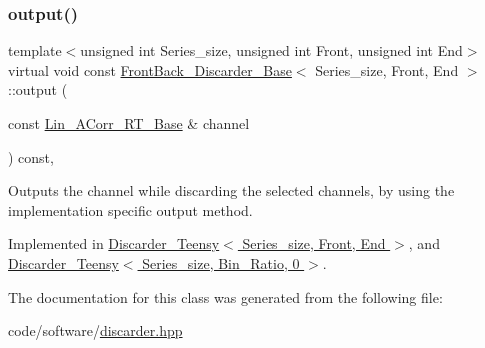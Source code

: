 \subsubsection{\texorpdfstring{output()}{output()}}
{\footnotesize\ttfamily template$<$unsigned int Series\+\_\+size, unsigned int Front, unsigned int End$>$ \\
virtual void const \hyperlink{classFrontBack__Discarder__Base}{Front\+Back\+\_\+\+Discarder\+\_\+\+Base}$<$ Series\+\_\+size, Front, End $>$\+::output (\begin{DoxyParamCaption}\item[{const \hyperlink{classLin__ACorr__RT__Base}{Lin\+\_\+\+A\+Corr\+\_\+\+R\+T\+\_\+\+Base} \&}]{channel }\end{DoxyParamCaption}) const\hspace{0.3cm}{\ttfamily [inline]}, {}}



Outputs the channel while discarding the selected channels, by using the implementation specific output method. 



Implemented in \hyperlink{classDiscarder__Teensy_a968465e540ae1372c26c9c6d0e5c928b}{Discarder\+\_\+\+Teensy$<$ Series\+\_\+size, Front, End $>$}, and \hyperlink{classDiscarder__Teensy_a968465e540ae1372c26c9c6d0e5c928b}{Discarder\+\_\+\+Teensy$<$ Series\+\_\+size, Bin\+\_\+\+Ratio, 0 $>$}.



The documentation for this class was generated from the following file\+:\begin{DoxyCompactItemize}
\item 
code/software/\hyperlink{discarder_8hpp}{discarder.\+hpp}\end{DoxyCompactItemize}
